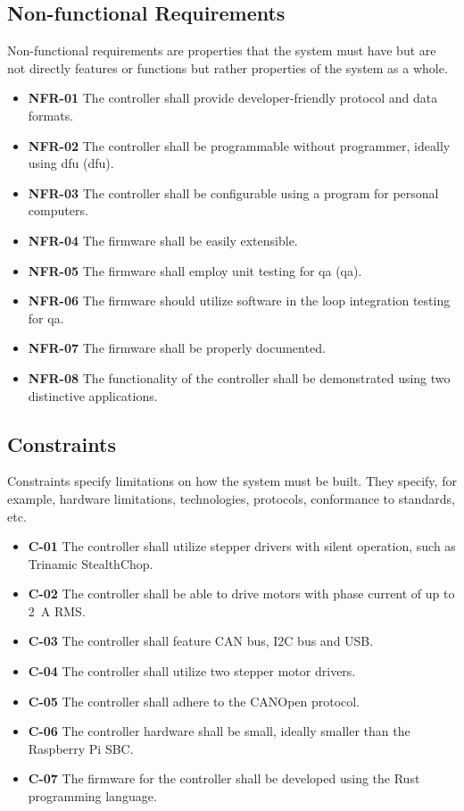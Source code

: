 \subsection{Non-functional Requirements}
\label{subsec:nonfunc_req}
Non-functional requirements are properties that the system must have but are not directly features or functions but rather properties of the system as a whole.

\begin{itemize}
    \item \textbf{NFR-01} The controller shall provide developer-friendly protocol and data formats.
    \item \textbf{NFR-02} The controller shall be programmable without programmer, ideally using \acs{dfu} (\acl{dfu}).
    \item \textbf{NFR-03} The controller shall be configurable using a program for personal computers.
    \item \textbf{NFR-04} The firmware shall be easily extensible.
    \item \textbf{NFR-05} The firmware shall employ unit testing for \acs{qa} (\acl{qa}).
    \item \textbf{NFR-06} The firmware should utilize software in the loop integration testing for \acs{qa}.
    \item \textbf{NFR-07} The firmware shall be properly documented.
    \item \textbf{NFR-08} The functionality of the controller shall be demonstrated using two distinctive applications.
\end{itemize}

\subsection{Constraints}
\label{subsec:constraints}
Constraints specify limitations on how the system must be built.
They specify, for example, hardware limitations, technologies, protocols, conformance to standards, etc.

\begin{itemize}
    \item \textbf{C-01} The controller shall utilize stepper drivers with silent operation, such as Trinamic StealthChop\texttrademark.
    \item \textbf{C-02} The controller shall be able to drive motors with phase current of up to 2~A RMS.
    \item \textbf{C-03} The controller shall feature CAN bus, I2C bus and USB.
    \item \textbf{C-04} The controller shall utilize two stepper motor drivers.
    \item \textbf{C-05} The controller shall adhere to the CANOpen protocol.
    \item \textbf{C-06} The controller hardware shall be small, ideally smaller than the Raspberry Pi SBC.
    \item \textbf{C-07} The firmware for the controller shall be developed using the Rust programming language.
\end{itemize}
